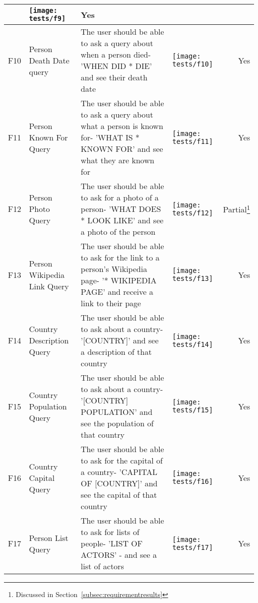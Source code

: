 \begin{landscape}
\begin{tabularx}{\hsize}{lXXXr}
		& \texttt{[image: tests/f9]} & Yes \\
		\midrule
		F10 & Person Death Date query
		& The user should be able to ask a query about when a person died\newline - 'WHEN DID * DIE' and see their death date
		& \texttt{[image: tests/f10]} & Yes \\
		\midrule
		F11 & Person Known For Query
		& The user should be able to ask a query about what a person is known for\newline - 'WHAT IS * KNOWN FOR' and see what they are known for
		& \texttt{[image: tests/f11]} & Yes \\
		\midrule
		F12 & Person Photo Query
		& The user should be able to ask for a photo of a person\newline - 'WHAT DOES * LOOK LIKE' and see a photo of the person
		& \texttt{[image: tests/f12]} & Partial\footnote{\label{fn:discuss}Discussed in Section~\ref{subsec:requirementresults}} \\
		\midrule
		F13 & Person Wikipedia Link Query
		& The user should be able to ask for the link to a person's Wikipedia page\newline - '* WIKIPEDIA PAGE' and receive a link to their page
		& \texttt{[image: tests/f13]} & Yes \\
		\midrule
		F14 & Country Description Query
		& The user should be able to ask about a country\newline - '[COUNTRY]' and see a description of that country
		& \texttt{[image: tests/f14]} & Yes \\
		\midrule
		F15 & Country Population Query
		& The user should be able to ask about a country\newline - '[COUNTRY] POPULATION' and see the population of that country
		& \texttt{[image: tests/f15]} & Yes \\
		\midrule
		F16 & Country Capital Query
		& The user should be able to ask for the capital of a country\newline - 'CAPITAL OF [COUNTRY]' and see the capital of that country
		& \texttt{[image: tests/f16]} & Yes \\
		\midrule
		F17 & Person List Query
		& The user should be able to ask for lists of people\newline - 'LIST OF ACTORS' - and see a list of actors 
		& \texttt{[image: tests/f17]} & Yes \\

\end{tabularx}
\end{landscape}
